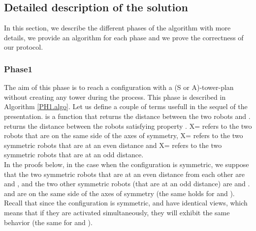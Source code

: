 \documentclass[12pt]{llncs}
\begin{document}
\subsection{\textbf{Detailed description of the solution}}

In this section, we describe the different phases of the algorithm with more details, we provide an algorithm for each phase and we prove the correctness of our protocol.
\subsubsection{\textbf{Phase1}}
The aim of this phase is to reach a configuration with a (S or A)-tower-plan without creating any tower during the process. This phase is described in Algorithm \ref{PH1.algo}. Let us 
define a couple of terms usefull in the sequel of the presentation.  is a function that returns the distance between the two robots  and .  returns the distance between the robots satisfying property . X= refers to the two robots that are on the same side of the axes of symmetry, X= refers to the two symmetric robots that are at an even distance and X= refers to the two symmetric robots that are at an odd distance.\\

In the proofs below, in the case when the configuration is symmetric, we suppose that the two symmetric robots that are at an even distance from each other are  and , and the two other symmetric robots (that are at an odd distance) are  and .  and  are on the same side of the axes of symmetry (the same holds for  and ). Recall that since the configuration is symmetric,  and  have identical views, which means that if they are activated simultaneously, they will exhibit the same behavior (the same for  and ).
\end{document}
